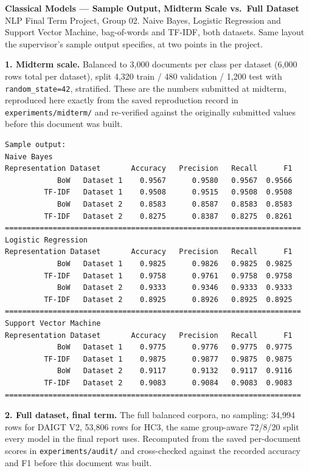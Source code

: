 \documentclass[11pt]{article}
\begin{document}
\begin{center}
{\Large\bfseries Classical Models --- Sample Output, Midterm Scale vs.\ Full Dataset}\\[4pt]
{\small NLP Final Term Project, Group 02. Naive Bayes, Logistic Regression and Support
Vector Machine, bag-of-words and TF-IDF, both datasets. Same layout the supervisor's
sample output specifies, at two points in the project.}
\end{center}

\vspace{6pt}
\noindent\textbf{1. Midterm scale.} Balanced to 3,000 documents per class per dataset
(6,000 rows total per dataset), split 4,320 train / 480 validation / 1,200 test with
\texttt{random\_state=42}, stratified. These are the numbers submitted at midterm,
reproduced here exactly from the saved reproduction record in
\texttt{experiments/midterm/} and re-verified against the originally submitted values
before this document was built.

\vspace{4pt}
\begin{lstlisting}
Sample output:
Naive Bayes
Representation Dataset       Accuracy   Precision   Recall      F1
            BoW   Dataset 1    0.9567      0.9580   0.9567  0.9566
         TF-IDF   Dataset 1    0.9508      0.9515   0.9508  0.9508
            BoW   Dataset 2    0.8583      0.8587   0.8583  0.8583
         TF-IDF   Dataset 2    0.8275      0.8387   0.8275  0.8261
====================================================================
Logistic Regression
Representation Dataset       Accuracy   Precision   Recall      F1
            BoW   Dataset 1    0.9825      0.9826   0.9825  0.9825
         TF-IDF   Dataset 1    0.9758      0.9761   0.9758  0.9758
            BoW   Dataset 2    0.9333      0.9346   0.9333  0.9333
         TF-IDF   Dataset 2    0.8925      0.8926   0.8925  0.8925
====================================================================
Support Vector Machine
Representation Dataset       Accuracy   Precision   Recall      F1
            BoW   Dataset 1    0.9775      0.9776   0.9775  0.9775
         TF-IDF   Dataset 1    0.9875      0.9877   0.9875  0.9875
            BoW   Dataset 2    0.9117      0.9132   0.9117  0.9116
         TF-IDF   Dataset 2    0.9083      0.9084   0.9083  0.9083
====================================================================
\end{lstlisting}

\vspace{10pt}
\noindent\textbf{2. Full dataset, final term.} The full balanced corpora, no sampling:
34,994 rows for DAIGT V2, 53,806 rows
for HC3, the same group-aware 72/8/20 split every model in the final report uses.
Recomputed from the saved per-document scores in \texttt{experiments/audit/} and
cross-checked against the recorded accuracy and F1 before this document was built.
\end{document}
